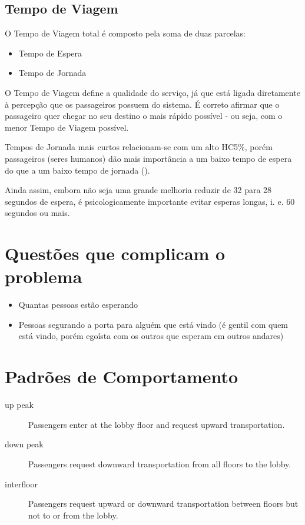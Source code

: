 \subsection{Tempo de Viagem}

  O Tempo de Viagem total é composto pela soma de duas parcelas:

  \begin{itemize}
    \item Tempo de Espera
    \item Tempo de Jornada
  \end{itemize}

  O Tempo de Viagem define a qualidade do serviço, já que está ligada diretamente à percepção que os passageiros possuem do sistema. É correto afirmar que o passageiro quer chegar no seu destino o mais rápido possível - ou seja, com o menor Tempo de Viagem possível.

  Tempos de Jornada mais curtos relacionam-se com um alto HC5\%, porém passageiros (seres humanos) dão mais importância a um baixo tempo de espera do que a um baixo tempo de jornada (\cite{KOEHLEROTTIGER02}).

  Ainda assim, embora não seja uma grande melhoria reduzir de 32 para 28 segundos de espera, é psicologicamente importante evitar esperas longas, i. e. 60 segundos ou mais.

\section{Questões que complicam o problema}

\begin{itemize}
\item Quantas pessoas estão esperando
\item Pessoas segurando a porta para alguém que está vindo (é gentil com quem está vindo, porém egoísta com os outros que esperam em outros andares)
\end{itemize}

\section{Padrões de Comportamento}

\begin{description}
\item[up peak] Passengers enter at the lobby floor and request upward transportation.
\item[down peak] Passengers request downward transportation from all floors to the lobby.
\item[interfloor] Passengers request upward or downward transportation between floors but not to or from the lobby.
\end{description}

